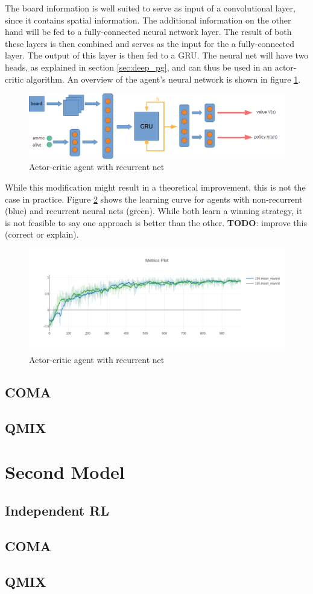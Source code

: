 The board information is well suited to serve as input of a convolutional layer, since it contains spatial information. The additional information on the other hand will be fed to a fully-connected neural network layer. The result of both these layers is then combined and serves as the input for the a fully-connected layer. The output of this layer is then fed to a GRU. The neural net will have two heads, as explained in section \ref{sec:deep_pg}, and can thus be used in an actor-critic algorithm. An overview of the agent's neural network is shown in figure \ref{fig:agent_net}.
\begin{figure}[htp]
    \centering
    \includegraphics[width=16cm]{images/agent_net.png}
    \caption{Actor-critic agent with recurrent net}
    \label{fig:agent_net}
\end{figure}

While this modification might result in a theoretical improvement, this is not the case in practice. Figure \ref{fig:newplot194_195} shows the learning curve for agents with non-recurrent (blue) and recurrent neural nets (green). While both learn a winning strategy, it is not feasible to say one approach is better than the other. \textbf{TODO}: improve this (correct or explain).

\begin{figure}[htp]
    \centering
    \includegraphics[width=16cm]{images/experiment2/newplot194_195.png}
    \caption{Actor-critic agent with recurrent net}
    \label{fig:newplot194_195}
\end{figure}

\subsection{COMA}
\subsection{QMIX}

\section{Second Model}
\subsection{Independent RL}
\subsection{COMA}
\subsection{QMIX}